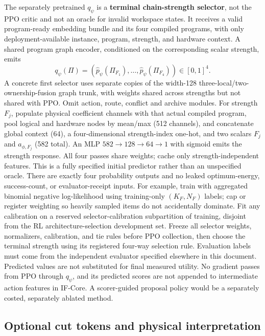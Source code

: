 \documentclass[11pt,a4paper]{article}
\theoremstyle{definition}\newtheorem{definition}[proposition]{Definition}
\begin{document}
The separately pretrained \(q_\psi\) is a \textbf{terminal chain-strength selector}, not the PPO critic and not an oracle for invalid workspace states. It receives a valid program-ready embedding bundle and its four compiled programs, with only deployment-available instance, program, strength, and hardware context. A shared program graph encoder, conditioned on the corresponding scalar strength, emits
\[
 q_\psi(\Pi)=
 (\widehat p_\psi(\Pi_{F_1}),\ldots,
  \widehat p_\psi(\Pi_{F_4}))\in[0,1]^4.
\]
A concrete first selector uses separate copies of the width-128 three-local/two-ownership-fusion graph trunk, with weights shared across strengths but not shared with PPO. Omit action, route, conflict and archive modules. For strength $F_j$, populate physical coefficient channels with that actual compiled program, pool logical and hardware nodes by mean/max (512 channels), and concatenate global context (64), a four-dimensional strength-index one-hot, and two scalars $F_j$ and $a_{\phi,F_j}$ (582 total). An MLP $582\to128\to64\to1$ with sigmoid emits the strength response. All four passes share weights; cache only strength-independent features. This is a fully specified initial predictor rather than an unspecified oracle. There are exactly four probability outputs and no leaked optimum-energy, success-count, or evaluator-receipt inputs. For example, train with aggregated binomial negative log-likelihood using training-only \((K_F,N_F)\) labels; cap or register weighting so heavily sampled items do not accidentally dominate. Fit any calibration on a reserved selector-calibration subpartition of training, disjoint from the RL architecture-selection development set. Freeze all selector weights, normalizers, calibration, and tie rules before PPO collection, then choose the terminal strength using its registered four-way selection rule. Evaluation labels must come from the independent evaluator specified elsewhere in this document. Predicted values are not substituted for final measured utility. No gradient passes from PPO through \(q_\psi\), and its predicted scores are not appended to intermediate action features in IF-Core. A scorer-guided proposal policy would be a separately costed, separately ablated method.

\subsection{Optional cut tokens and physical interpretation}
\end{document}
